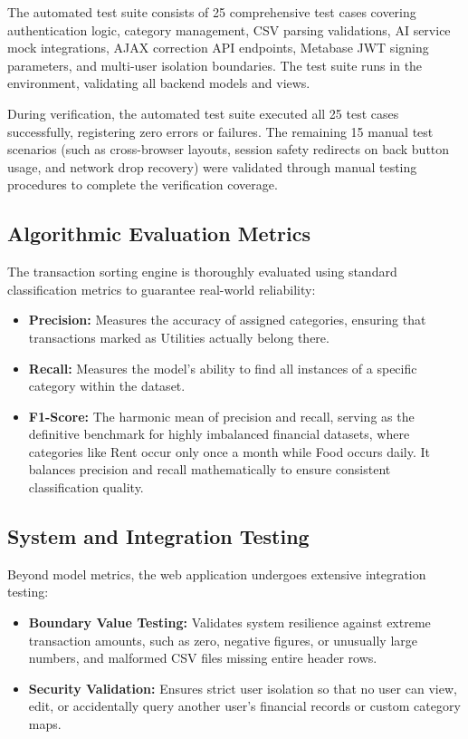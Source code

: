 The automated test suite consists of 25 comprehensive test cases covering authentication logic, category management, CSV parsing validations, AI service mock integrations, AJAX correction API endpoints, Metabase JWT signing parameters, and multi-user isolation boundaries. The test suite runs in the environment, validating all backend models and views.

During verification, the automated test suite executed all 25 test cases successfully, registering zero errors or failures. The remaining 15 manual test scenarios (such as cross-browser layouts, session safety redirects on back button usage, and network drop recovery) were validated through manual testing procedures to complete the verification coverage.

\subsection{Algorithmic Evaluation Metrics}
The transaction sorting engine is thoroughly evaluated using standard classification metrics to guarantee real-world reliability:
\begin{itemize}
	\item \textbf{Precision:} Measures the accuracy of assigned categories, ensuring that transactions marked as Utilities actually belong there.
	\item \textbf{Recall:} Measures the model's ability to find all instances of a specific category within the dataset.
	\item \textbf{F1-Score:} The harmonic mean of precision and recall, serving as the definitive benchmark for highly imbalanced financial datasets, where categories like Rent occur only once a month while Food occurs daily. It balances precision and recall mathematically to ensure consistent classification quality.
\end{itemize}

\subsection{System and Integration Testing}
Beyond model metrics, the web application undergoes extensive integration testing:
\begin{itemize}
	\item \textbf{Boundary Value Testing:} Validates system resilience against extreme transaction amounts, such as zero, negative figures, or unusually large numbers, and malformed CSV files missing entire header rows.
	\item \textbf{Security Validation:} Ensures strict user isolation so that no user can view, edit, or accidentally query another user's financial records or custom category maps.
\end{itemize}

